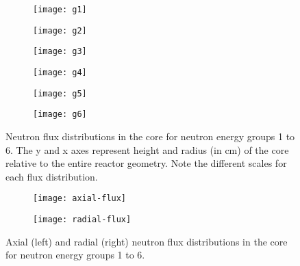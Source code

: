 \begin{figure}[b!]
    \centering
    \begin{subfigure}[t]{.325\textwidth}
        \centering
        \texttt{[image: g1]}
    \end{subfigure}
    \begin{subfigure}[t]{.325\textwidth}
        \centering
        \texttt{[image: g2]}
    \end{subfigure}
    \begin{subfigure}[t]{.325\textwidth}
        \centering
        \texttt{[image: g3]}
    \end{subfigure}
    \begin{subfigure}[t]{.325\textwidth}
        \centering
        \texttt{[image: g4]}
    \end{subfigure}
    \begin{subfigure}[t]{.325\textwidth}
        \centering
        \texttt{[image: g5]}
    \end{subfigure}
    \begin{subfigure}[t]{.325\textwidth}
        \centering
        \texttt{[image: g6]}
    \end{subfigure}
    \caption{Neutron flux distributions in the core for neutron energy groups
    1 to 6. The y and x axes represent height and radius (in cm) of the core
    relative to the entire reactor geometry. Note the different scales for
    each flux distribution.}
    \label{fig:neutronflux}
\end{figure}

\begin{figure}[t!]
    \centering
    \begin{subfigure}[t]{.49\textwidth}
        \centering
        \texttt{[image: axial-flux]}
    \end{subfigure}
    \begin{subfigure}[t]{.49\textwidth}
        \centering
        \texttt{[image: radial-flux]}
    \end{subfigure}
    \caption{Axial (left) and radial (right) neutron flux distributions in the
    core for neutron energy groups 1 to 6.}
    \label{fig:axialradial}
\end{figure}

